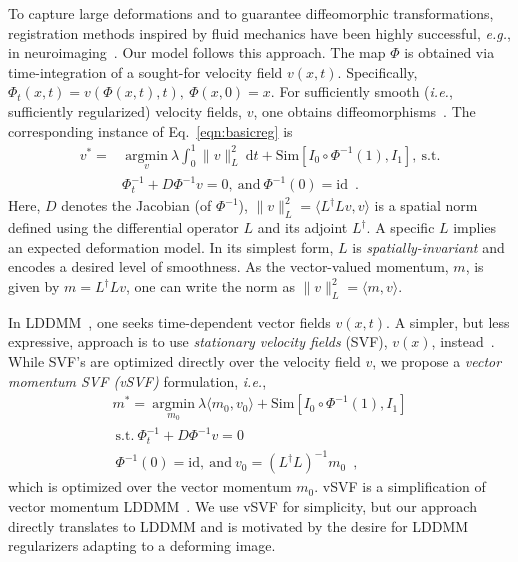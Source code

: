 \documentclass[10pt,twocolumn,letterpaper,table]{article}
\numberwithin{equation}{section}
\theoremstyle{plain}
\theoremstyle{definition}
\def\eg{\emph{e.g.}}  \def\Eg{\emph{E.g.}}
\def\ie{\emph{i.e.}}  \def\Ie{\emph{I.e.}}
\begin{document}
To capture large deformations and to guarantee diffeomorphic transformations, registration methods inspired by fluid mechanics have been highly successful, \eg, in neuroimaging~\cite{avants2009advanced}. Our model follows this approach. The map $\Phi$ is obtained via time-integration of a sought-for velocity field $v(x,t)$. Specifically, $\Phi_t(x,t) = v(\Phi(x,t),t),~\Phi(x,0)=x$. For sufficiently smooth (\ie, sufficiently regularized) velocity fields, $v$, one obtains diffeomorphisms~\cite{dupuis1998}. The corresponding instance of Eq.~\eqref{eqn:basicreg} is
\begin{align*}
  v^* = &~\underset{v}{\text{argmin}}~\lambda \int_0^1 \|v\|_L^2~\mathrm{d}t + \text{Sim}[I_0\circ\Phi^{-1}(1),I_1],~\text{s.t.}\\
  & \Phi^{-1}_t + D\Phi^{-1}v=0,~\text{and}~\Phi^{-1}(0)=\text{id}\enspace.
\end{align*}
Here, $D$ denotes the Jacobian (of $\Phi^{-1}$), $\|v\|^2_L=\langle L^\dagger L v,v\rangle$ is a spatial norm defined using the differential operator $L$ and its adjoint $L^\dagger$. A specific $L$ implies an expected deformation model. In its simplest form, $L$ is \emph{spatially-invariant} and encodes a desired level of smoothness. As the vector-valued momentum, $m$, is given by $m=L^\dagger L v$, one can write the norm as $\|v\|_L^2 = \langle m,v\rangle$. 

In LDDMM~\cite{beg2005}, one seeks time-dependent vector fields $v(x,t)$. A simpler, but less expressive, approach is to use \emph{stationary velocity fields} (SVF), $v(x)$, instead~\cite{rohe2017svf}. While SVF's are  optimized directly over the velocity field $v$, we propose a \emph{vector momentum SVF (vSVF)} formulation, \ie, 
\begin{equation}
\begin{split}
    m^* = ~\underset{m_0}{\text{argmin}}~\lambda\langle m_0,v_0\rangle + \text{Sim}[I_0\circ\Phi^{-1}(1),I_1]\\
  ~\text{s.t.}~\Phi^{-1}_t + D\Phi^{-1}v=0\\
  ~\Phi^{-1}(0)=\text{id},~\text{and}~v_0=(L^\dagger L)^{-1}m_0\enspace,
  \label{eq:vsvf}
\end{split}
\end{equation}
which is optimized over the vector momentum $m_0$. vSVF is a simplification of vector momentum LDDMM~\cite{vialard2012diffeomorphic}. We use vSVF for simplicity, but our approach directly translates to LDDMM and is motivated by the desire for LDDMM regularizers adapting to a deforming image.
\end{document}
